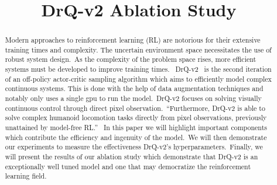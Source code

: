 \documentclass[conference]{./IEEEtran/IEEEtran} %
\begin{document}
    \title{DrQ-v2 Ablation Study}

    \author{
        \and
        \and
    }

    \maketitle

    \begin{abstract}
        
    Modern approaches to reinforcement learning (RL) are notorious for their extensive training times and complexity. The uncertain
    environment space necessitates the use of robust system design.\ As the complexity of the problem space rises, more efficient
    systems must be developed to improve training times. \ DrQ-v2~\cite{DrQv2} is the second iteration of an off-policy actor-critic
    sampling algorithm which aims to efficiently model complex continuous systems. This is done with the help of data augmentation
    techniques and notably only uses a single gpu to run the model.\ DrQ-v2 focuses on solving visually continuous control through
    direct pixel observation.\ \enquote{Furthermore, DrQ-v2 is able to solve complex humanoid locomotion tasks directly from pixel
    observations, previously unattained by model-free RL.}~\cite{DrQv2} In this paper we will highlight important components
    which contribute the efficiency and ingenuity of the model.\ We will then demonstrate our experiments to measure the effectiveness
    DrQ-v2's hyperparameters.\ Finally, we will present the results of our ablation study which demonstrate that DrQ-v2 is
    an exceptionally well tuned model and one that may democratize the reinforcement learning field.\

    \end{abstract}
\end{document}
